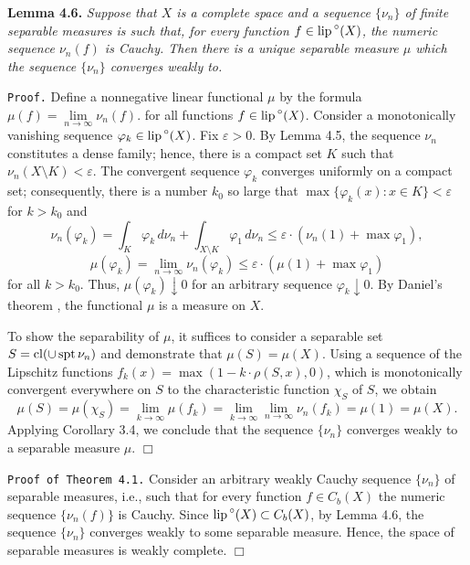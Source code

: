 \documentclass[11pt,a4paper]{article}
\begin{document}
\vspace{1em} {\bf Lemma 4.6.} \sl
Suppose that $X$ is a complete space and a sequence $\{\nu_n\}$ of finite separable measures is
such that, for every function $f\in{\rm lip\,}^{\circ}(X)$,
the numeric sequence $\nu_n(f)$ is Cauchy. Then there is a unique
separable measure $\mu$ which the sequence $\{\nu_n\}$ converges weakly to. \rm
\vspace{1em} %

{\tt Proof.} %
\sloppy Define a nonnegative linear functional $\mu$ by the formula
${\mu(f)=\lim\limits_{n\to\infty}\nu_n(f)}$.
for all functions $f\in{\rm lip\,}^{\circ}(X)$.
Consider a monotonically vanishing sequence $\varphi_k\in{\rm lip\,}^{\circ}(X)$.
Fix $\varepsilon>0$.
By Lemma 4.5,
the sequence $\nu_n$ constitutes a dense family;
hence, there is a compact set $K$ such that
$\nu_n(X\setminus K)<\varepsilon$.
The convergent sequence $\varphi_k$ converges
uniformly on a compact set; consequently, there is a number $k_0$
so large that
${\max\{\varphi_k(x): x\in K\}<\varepsilon}$ for $k>k_0$ and
$$\nu_n(\varphi_k)=\int_K \varphi_k\,d\nu_n +
  \int_{X\setminus K} \varphi_1\,d\nu_n \le
  \varepsilon \cdot(\nu_n(1) + \max\varphi_1),$$
$$\mu(\varphi_k)=\lim\limits_{n\to\infty}\nu_n(\varphi_k)\le %
  \varepsilon \cdot(\mu(1) + \max\varphi_1)$$
for all $k>k_0$.
Thus, $\mu(\varphi_k)\downarrow 0$
for an arbitrary sequence $\varphi_k \downarrow 0$.
By Daniel's theorem \cite[II.7.1]{Nv},
the functional $\mu$ is a measure on $X$.

To show the separability of $\mu$, it suffices to consider
a separable set $S={\rm cl}(\cup\, {\rm spt\,}\nu_n)$ and demonstrate
that $\mu(S)=\mu(X)$.
Using a sequence of the Lipschitz functions
$f_k(x)=\max( 1-k\cdot\rho(S,x), 0)$,
which is monotonically convergent everywhere on $S$
to the characteristic function $\chi_S$ of $S$, we obtain
$$\mu(S)=\mu(\chi_S)=\lim\limits_{k\to\infty}\mu(f_k)=
  \lim_{k\to\infty}\lim_{n\to\infty}\nu_n(f_k)=\mu(1)=\mu(X).$$
Applying Corollary 3.4, we conclude that the sequence
$\{\nu_n\}$ converges weakly to a separable measure $\mu$.
\hbox{$\Box$} \vspace{1em}

{\tt Proof of Theorem 4.1.}
 Consider an arbitrary weakly Cauchy sequence $\{\nu_n\}$ of separable measures,
i.e., such that for every function ${f\in C_b(X)}$ the numeric sequence
$\{\nu_n(f)\}$ is Cauchy. Since
${\rm lip\,}^{\circ}(X)\subset C_b(X)$, by Lemma 4.6, the sequence
$\{\nu_n\}$ converges weakly to some separable measure.
Hence, the space of separable measures is weakly complete.
\hbox{$\Box$} \vspace{1em}
\end{document}
